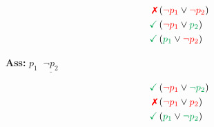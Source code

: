 \begin{minipage}[t]{0.2\textwidth}
$$
\begin{aligned}
\text{\textcolor{red}{\xmark}} &\left(\text{\textcolor{red}{$\neg p_1$}} \vee \text{\textcolor{red}{$\neg p_{2}$}}\right) \\
\textcolor{Green}{\checkmark} &\left(\text{\textcolor{red}{$\neg p_1$}} \vee \text{\textcolor{Green}{$p_{2}$}}\right) \\
\textcolor{Green}{\checkmark} &\left(\text{\textcolor{Green}{$p_1$}} \vee \text{\textcolor{red}{$\neg p_{2}$}}\right)
\end{aligned}
$$
\end{minipage}

\begin{minipage}[t]{0.2\textwidth}
  \textbf{Ass:} $p_1 \;\; \underline{\text{$\neg p_2$}}$
  \centering{}
  \label{fig1}
  \vspace{0.25cm}
\end{minipage}
\begin{minipage}[t]{0.2\textwidth}
$$
\begin{aligned}
\text{\textcolor{Green}{\checkmark}} &\left(\text{\textcolor{red}{$\neg p_1$}} \vee \text{\textcolor{Green}{$\neg p_{2}$}}\right) \\
\text{\textcolor{red}{\xmark}} &\left(\text{\textcolor{red}{$\neg p_1$}} \vee \text{\textcolor{red}{$p_{2}$}}\right) \\
\textcolor{Green}{\checkmark} &\left(\text{\textcolor{Green}{$p_1$}} \vee \text{\textcolor{Green}{$\neg p_{2}$}}\right)
\end{aligned}
$$
\end{minipage}
